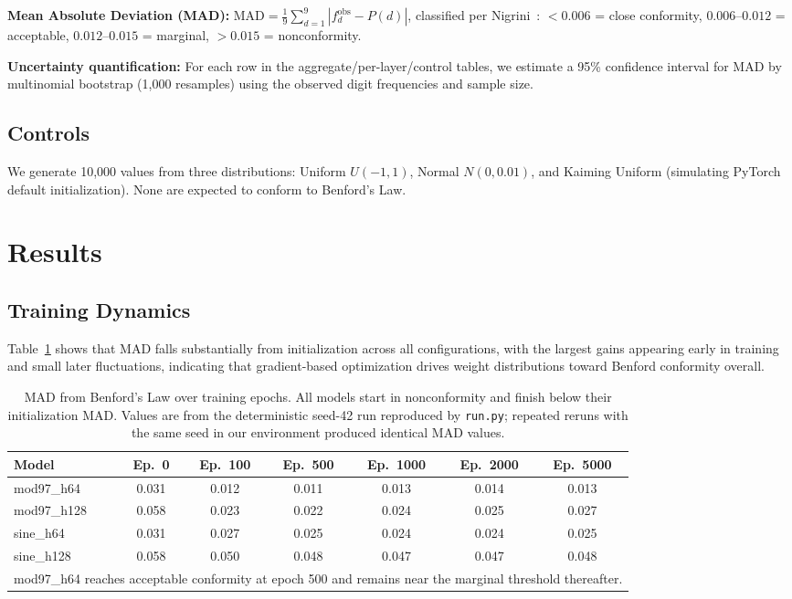 \documentclass[11pt]{article}
\begin{document}
\textbf{Mean Absolute Deviation (MAD):} $\text{MAD} = \frac{1}{9}\sum_{d=1}^{9} |f_d^{\text{obs}} - P(d)|$, classified per Nigrini~\cite{nigrini2012}: $< 0.006$ = close conformity, $0.006$--$0.012$ = acceptable, $0.012$--$0.015$ = marginal, $> 0.015$ = nonconformity.

\textbf{Uncertainty quantification:} For each row in the aggregate/per-layer/control tables, we estimate a 95\% confidence interval for MAD by multinomial bootstrap (1{,}000 resamples) using the observed digit frequencies and sample size.

\subsection{Controls}
We generate 10{,}000 values from three distributions: Uniform $U(-1,1)$, Normal $N(0, 0.01)$, and Kaiming Uniform (simulating PyTorch default initialization). None are expected to conform to Benford's Law.

\section{Results}

\subsection{Training Dynamics}

Table~\ref{tab:dynamics} shows that MAD falls substantially from initialization across all configurations, with the largest gains appearing early in training and small later fluctuations, indicating that gradient-based optimization drives weight distributions toward Benford conformity overall.

\begin{table}[h]
\centering
\small
\caption{MAD from Benford's Law over training epochs. All models start in nonconformity and finish below their initialization MAD. Values are from the deterministic seed-42 run reproduced by \texttt{run.py}; repeated reruns with the same seed in our environment produced identical MAD values.}
\label{tab:dynamics}
\begin{tabular}{lcccccc}
\toprule
\textbf{Model} & \textbf{Ep.\ 0} & \textbf{Ep.\ 100} & \textbf{Ep.\ 500} & \textbf{Ep.\ 1000} & \textbf{Ep.\ 2000} & \textbf{Ep.\ 5000} \\
\midrule
mod97\_h64  & 0.031 & 0.012 & 0.011 & 0.013 & 0.014 & 0.013 \\
mod97\_h128 & 0.058 & 0.023 & 0.022 & 0.024 & 0.025 & 0.027 \\
sine\_h64   & 0.031 & 0.027 & 0.025 & 0.024 & 0.024 & 0.025 \\
sine\_h128  & 0.058 & 0.050 & 0.048 & 0.047 & 0.047 & 0.048 \\
\bottomrule
\multicolumn{7}{l}{\scriptsize mod97\_h64 reaches acceptable conformity at epoch 500 and remains near the marginal threshold thereafter.}
\end{tabular}
\end{table}
\end{document}
